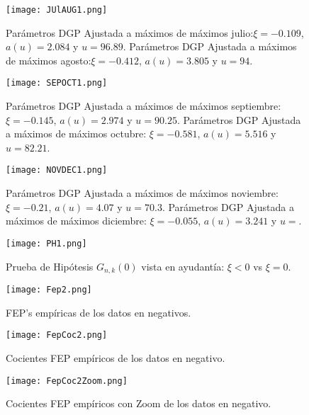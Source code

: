 \documentclass[10.5pt,notitlepage]{article}
\theoremstyle{plain}
\begin{document}
\begin{figure}[htb]
    \centering
    \texttt{[image: JUlAUG1.png]}
    \caption{Parámetros DGP Ajustada a máximos de máximos julio:\(\xi = -0.109\), \(a(u)=2.084\) y \(u =96.89\). Parámetros DGP Ajustada a máximos de máximos agosto:\(\xi = -0.412\), \(a(u)=3.805\) y \(u = 94\).}
    \label{fig:10}  
\end{figure}


\begin{figure}[htb]
    \centering
    \texttt{[image: SEPOCT1.png]}
    \caption{Parámetros DGP Ajustada a máximos de máximos septiembre: \(\xi =  -0.145\), \(a(u)=2.974\) y \(u = 90.25\). Parámetros DGP Ajustada a máximos de máximos octubre: \(\xi = -0.581\), \(a(u)= 5.516\) y \(u = 82.21\).}
    \label{fig:11}
\end{figure} 


\begin{figure}[htb]
    \centering
    \texttt{[image: NOVDEC1.png]}
    \caption{Parámetros DGP Ajustada a máximos de máximos noviembre: \(\xi = -0.21\), \(a(u)= 4.07\) y \(u = 70.3\). Parámetros DGP Ajustada a máximos de máximos diciembre: \(\xi =-0.055\), \(a(u)=3.241\) y \(u = \).}
    \label{fig:12}
\end{figure}


\begin{figure}[htb]
    \centering
    \texttt{[image: PH1.png]}
\caption{Prueba de Hipótesis \(G_{n,k}(0)\) vista en ayudantía: \(\xi <0\) vs \(\xi = 0\).}
    \label{fig:13}
\end{figure}

\begin{figure}[htb]
    \centering
    \texttt{[image: Fep2.png]}
    \caption{FEP's empíricas de los datos en negativos.}
    \label{fig:2/2}
\end{figure}

\begin{figure}[htb]
    \centering
    \texttt{[image: FepCoc2.png]}
    \caption{Cocientes FEP empíricos de los datos en negativo.}
    \label{fig:2/3}
\end{figure}

\begin{figure}[htb]
    \centering
    \texttt{[image: FepCoc2Zoom.png]}
    \caption{Cocientes FEP empíricos con Zoom de los datos en negativo.}
    \label{fig:2/4}
\end{figure}
\end{document}
